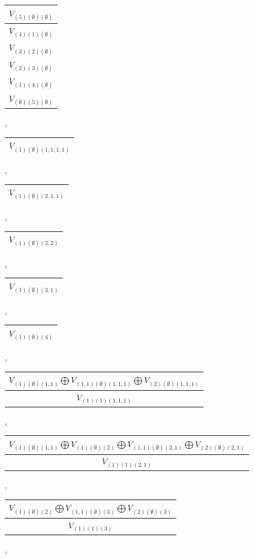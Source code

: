 \documentclass[letterpaper,11pt]{article}
\begin{document}
	\begin{tabular}{| c |}
		\hline
		$V_{(5)(\emptyset)(\emptyset)}$\\
		\hline
		$V_{(4)(1)(\emptyset)}$\\
		\hline
		$V_{(3)(2)(\emptyset)}$\\
		\hline
		$V_{(2)(3)(\emptyset)}$\\
		\hline
		$V_{(1)(4)(\emptyset)}$\\
		\hline
		$V_{(\emptyset)(5)(\emptyset)}$\\
		\hline
	\end{tabular}, 
	\begin{tabular}{| c |}
		\hline
		$V_{(1)(\emptyset)(1,1,1,1)}$\\
		\hline
	\end{tabular}, 
	\begin{tabular}{| c |}
		\hline
		$V_{(1)(\emptyset)(2,1,1)}$\\
		\hline
	\end{tabular}, 
	\begin{tabular}{| c |}
		\hline
		$V_{(1)(\emptyset)(2,2)}$\\
		\hline
	\end{tabular}, 
	\begin{tabular}{| c |}
		\hline
		$V_{(1)(\emptyset)(3,1)}$\\
		\hline
	\end{tabular}, 
	\begin{tabular}{| c |}
		\hline
		$V_{(1)(\emptyset)(4)}$\\
		\hline
	\end{tabular}, 
	\begin{tabular}{| c |}
		\hline
		$V_{(1)(\emptyset)(1,1)}$$\bigoplus$$V_{(1,1)(\emptyset)(1,1,1)}$$\bigoplus$$V_{(2)(\emptyset)(1,1,1)}$\\
		\hline
		$V_{(1)(1)(1,1,1)}$\\
		\hline
	\end{tabular}, 
	\newline 
	\begin{tabular}{| c |}
		\hline
		$V_{(1)(\emptyset)(1,1)}$$\bigoplus$$V_{(1)(\emptyset)(2)}$$\bigoplus$$V_{(1,1)(\emptyset)(2,1)}$$\bigoplus$$V_{(2)(\emptyset)(2,1)}$\\
		\hline
		$V_{(1)(1)(2,1)}$\\
		\hline
	\end{tabular},
	\begin{tabular}{| c |}
		\hline
		$V_{(1)(\emptyset)(2)}$$\bigoplus$$V_{(1,1)(\emptyset)(3)}$$\bigoplus$$V_{(2)(\emptyset)(3)}$\\
		\hline
		$V_{(1)(1)(3)}$\\
		\hline
	\end{tabular}, 
\end{document}
